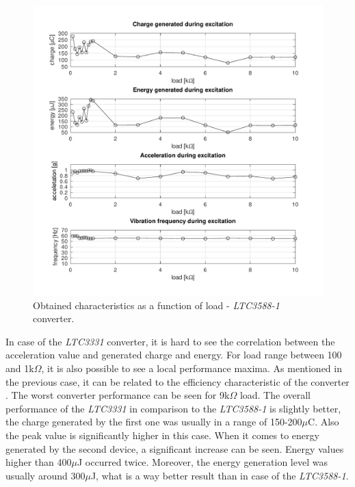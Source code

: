 \documentclass[12pt,a4paper]{article}
\begin{document}
\begin{figure}[ht!]
\includegraphics[scale=0.85]{results3588.pdf}
\caption{Obtained characteristics as a function of load - \textit{LTC3588-1} converter.}
\label{fig:results3588}
\end{figure}
\par
In case of the \textit{LTC3331} converter, it is hard to see the correlation between the acceleration value and generated charge and energy. For load range between 100 and 1k$\Omega$, it is also possible to see a local performance maxima. As mentioned in the previous case, it can be related to the efficiency characteristic of the converter \cite{ltc3331_params}. The worst converter performance can be seen for 9k$\Omega$ load. The overall performance of the \textit{LTC3331} in comparison to the \textit{LTC3588-1} is slightly better, the charge generated by the first one was usually in a range of 150-200$\mu$C. Also the peak value is significantly higher in this case. When it comes to energy generated by the second device, a significant increase can be seen. Energy values higher than 400$\mu$J occurred twice. Moreover, the energy generation level was usually around 300$\mu$J, what is a way better result than in case of the \textit{LTC3588-1}.
\end{document}
